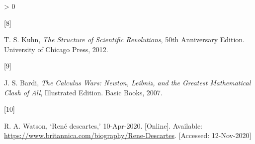 \documentclass[
  11pt,
  british,
  a4paper,
]{article}
\newlength{\cslhangindent}
\newlength{\csllabelwidth}
\newenvironment{CSLReferences}[2] %
 {%
  \setlength{\parindent}{0pt}
  \ifodd #1 \everypar{\setlength{\hangindent}{\cslhangindent}}\ignorespaces\fi
  \ifnum #2 > 0
  \setlength{\parskip}{#2\baselineskip}
  \fi
 }%
 {}
\newcommand{\CSLLeftMargin}[1]{\parbox[t]{\csllabelwidth}{#1}}
\newcommand{\CSLRightInline}[1]{\parbox[t]{\linewidth - \csllabelwidth}{#1}\break}
\begin{document}
\begin{CSLReferences}{0}{0}
\leavevmode\hypertarget{ref-kuhn2012}{}%
\CSLLeftMargin{{[}8{]} }
\CSLRightInline{T. S. Kuhn, \emph{{The Structure of Scientific
Revolutions}}, 50th Anniversary Edition. University of Chicago Press,
2012. }

\leavevmode\hypertarget{ref-bardi2007}{}%
\CSLLeftMargin{{[}9{]} }
\CSLRightInline{J. S. Bardi, \emph{{The Calculus Wars: Newton, Leibniz,
and the Greatest Mathematical Clash of All}}, Illustrated Edition. Basic
Books, 2007. }

\leavevmode\hypertarget{ref-watson2020}{}%
\CSLLeftMargin{{[}10{]} }
\CSLRightInline{R. A. Watson, {`René descartes,'} 10-Apr-2020.
{[}Online{]}. Available:
\url{https://www.britannica.com/biography/Rene-Descartes}. {[}Accessed:
12-Nov-2020{]}}

\end{CSLReferences}
\end{document}
